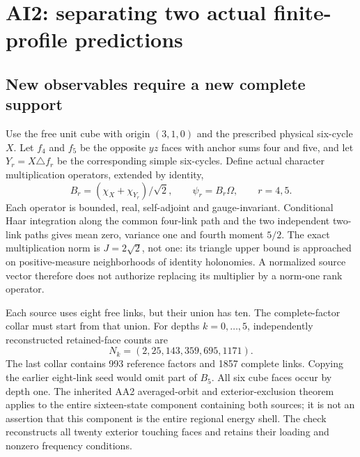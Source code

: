 \section{AI2: separating two actual finite-profile predictions\workstar}
\subsection{New observables require a new complete support}
Use the free unit cube with origin $(3,1,0)$ and the prescribed physical six-cycle $X$. Let $f_4$ and $f_5$ be the opposite $yz$ faces with anchor sums four and five, and let $Y_r=X\triangle f_r$ be the corresponding simple six-cycles. Define actual character multiplication operators, extended by identity,
\begin{equation}
B_r=(\chi_X+\chi_{Y_r})/\sqrt2,\qquad \psi_r=B_r\Omega,\qquad r=4,5.
\label{eq:probes}
\end{equation}
Each operator is bounded, real, self-adjoint and gauge-invariant. Conditional Haar integration along the common four-link path and the two independent two-link paths gives mean zero, variance one and fourth moment $5/2$. The exact multiplication norm is $J=2\sqrt2$, not one: its triangle upper bound is approached on positive-measure neighborhoods of identity holonomies. A normalized source vector therefore does not authorize replacing its multiplier by a norm-one rank operator.

Each source uses eight free links, but their union has ten. The complete-factor collar must start from that union. For depths $k=0,\ldots,5$, independently reconstructed retained-face counts are
\begin{equation}
N_k=(2,25,143,359,695,1171).
\label{eq:collars}
\end{equation}
The last collar contains 993 reference factors and 1857 complete links. Copying the earlier eight-link seed would omit part of $B_5$. All six cube faces occur by depth one. The inherited AA2 averaged-orbit and exterior-exclusion theorem applies to the entire sixteen-state component containing both sources; it is not an assertion that this component is the entire regional energy shell. The check reconstructs all twenty exterior touching faces and retains their loading and nonzero frequency conditions.

